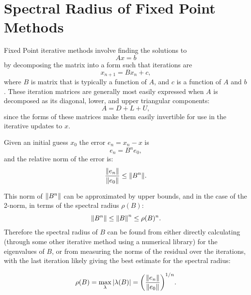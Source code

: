 \documentclass[12pt,letterpaper]{article}
\title{\large \doctitle}
\author{}
\date{}%
\begin{document}
\maketitle
\thispagestyle{fancy}
\singlespacing

\section{Spectral Radius of Fixed Point Methods}
Fixed Point iterative methods involve finding the solutions to 
\begin{equation}
  Ax = b  
\end{equation}
by decomposing the matrix into a form such that iterations are
\begin{equation}
  x_{n+1} = Bx_{n} + c,  
\end{equation}
where $B$ is matrix that is typically a function of $A$, and $c$ is a function of $A$ and $b$. These iteration matrices are generally most easily expressed when $A$ is decomposed as its diagonal, lower, and upper triangular components:
\begin{equation}
  A = D + L + U,
\end{equation} 
since the forms of these matrices make them easily invertible for use in the iterative updates to $x$.

Given an initial guess $x_0$ the error $e_{n} = x_{n} - x$ is
\begin{equation}
  e_n = B^{n}e_0, 
\end{equation}
and the relative norm of the error is:
\begin{equation}
  \frac{\norm{e_{n}}}{\norm{e_{0}}} \leq \norm{B^n}.
\end{equation} 

This norm of $\norm{B^n}$ can be approximated by upper bounds, and in the case of the 2-norm, in terms of the spectral radius $\rho(B)$:
\begin{equation}
  \norm{B^n} \leq \norm{B}^n \leq \rho(B)^n.
\end{equation}
Therefore the spectral radius of $B$ can be found from either directly calculating (through some other iterative method using a numerical library) for the eigenvalues of $B$, or from measuring the norms of the residual over the iterations, with the last iteration likely giving the best estimate for the spectral radius:

\begin{equation}
  \rho(B) = \max_{\lambda} \abs{\lambda(B)} = {\left(\frac{\norm{e_{n}}}{\norm{e_{0}}}\right)}^{1/n}.
\end{equation}
\end{document}

